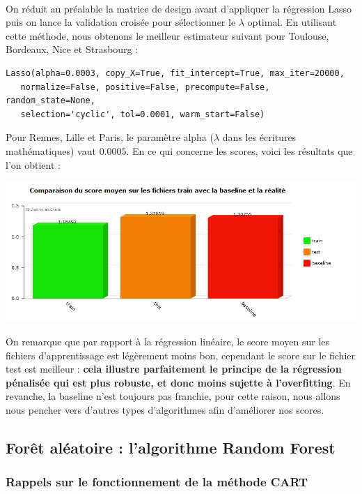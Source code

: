 \documentclass[14pt, openany]{article}
\begin{document}
\paragraph{}
On réduit au préalable la matrice de design avant d'appliquer la régression Lasso puis on lance la validation croisée pour sélectionner le $\lambda$ optimal. En utilisant cette méthode, nous obtenons le meilleur estimateur suivant pour Toulouse, Bordeaux, Nice et Strasbourg :
\begin{verbatim}
Lasso(alpha=0.0003, copy_X=True, fit_intercept=True, max_iter=20000,
   normalize=False, positive=False, precompute=False, random_state=None,
   selection='cyclic', tol=0.0001, warm_start=False)
\end{verbatim}
Pour Rennes, Lille et Paris, le paramètre alpha ($\lambda$ dans les écritures mathématiques) vaut $0.0005$. En ce qui concerne les scores, voici les résultats que l'on obtient :
\begin{center}
\includegraphics[scale=0.8]{Images/score_lasso.png}
\end{center}
On remarque que par rapport à la régression linéaire, le score moyen sur les fichiers d'apprentissage est légèrement moins bon, cependant le score sur le fichier test est meilleur : \textbf{cela illustre parfaitement le principe de la régression pénalisée qui est plus robuste, et donc moins sujette à l'overfitting}. En revanche, la baseline n'est toujours pas franchie, pour cette raison, nous allons nous pencher vers d'autres types d'algorithmes afin d'améliorer nos scores.
\subsection{Forêt aléatoire : l'algorithme Random Forest}
\subsubsection{Rappels sur le fonctionnement de la méthode CART}
\end{document}
